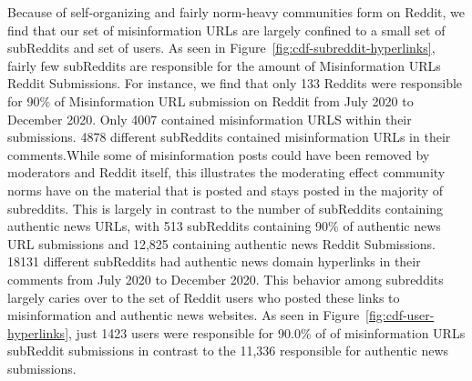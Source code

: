Because of self-organizing and fairly norm-heavy communities form on Reddit, we find that our set of misinformation URLs are largely confined to a small set of subReddits and set of users. As seen in Figure~\ref{fig:cdf-subreddit-hyperlinks}, fairly few subReddits are responsible for the amount of Misinformation URLs Reddit Submissions. For instance, we find that only 133 Reddits were responsible for 90\% of Misinformation URL submission on Reddit from July 2020 to December 2020. Only 4007 contained misinformation URLS within their submissions. 4878 different subReddits contained misinformation URLs in their comments.While some of misinformation posts could have been removed by moderators and Reddit itself, this illustrates the moderating effect community norms have on the material that is posted and stays posted in  the majority of subreddits. This is largely in contrast to the number of subReddits containing authentic news URLs, with 513 subReddits containing 90\% of authentic news URL submissions and 12,825 containing authentic news Reddit Submissions. 18131 different subReddits had authentic news domain hyperlinks in their comments from July 2020 to December 2020. This behavior among subreddits largely caries over to the set of Reddit users who posted these links to misinformation and authentic news websites. As seen in Figure~\ref{fig:cdf-user-hyperlinks}, just 1423 users were responsible for 90.0\% of of misinformation URLs subReddit submissions in contrast to the 11,336 responsible for authentic news submissions. 
